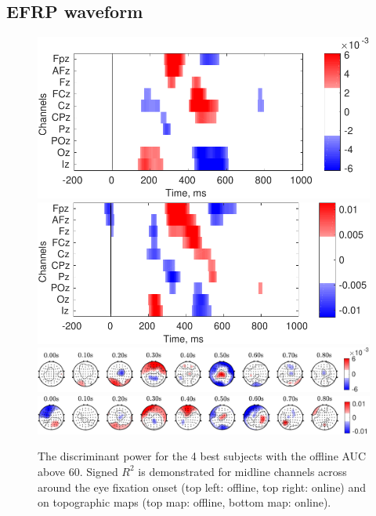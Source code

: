\documentclass[12pt]{iopart}
\begin{document}
\subsection{EFRP waveform}
\begin{figure}[!t]
    \includegraphics[trim={0cm 0.01cm 0cm 0cm},clip,width=0.45\columnwidth]{../images/SignR_offline.pdf}
    \includegraphics[trim={0cm 0cm 0cm 0.01cm},clip,width=0.45\columnwidth]{../images/SignR_online.pdf}
    \includegraphics[trim={0cm 0cm 0cm 0cm},clip,width=0.9\columnwidth]{../images/offline/TopoPlot_TLock-start_signRSquare_Saggregate_objrec_subjects_popuponline_s1.pdf}
    \includegraphics[trim={0cm 0cm 0cm 0cm},clip,width=0.9\columnwidth]{../images/online/TopoPlot_TLock-start_signRSquare_Saggregate_objrec_subjects_popuponline_s1.pdf}
    \caption{The discriminant power for the 4 best subjects with the offline AUC above 60.
    Signed $R^2$ is demonstrated for midline channels across around the eye fixation onset
    (top left: offline, top right: online) and on topographic maps (top map: offline, bottom map: online).}
\label{fig:signR}
\end{figure}
\end{document}
